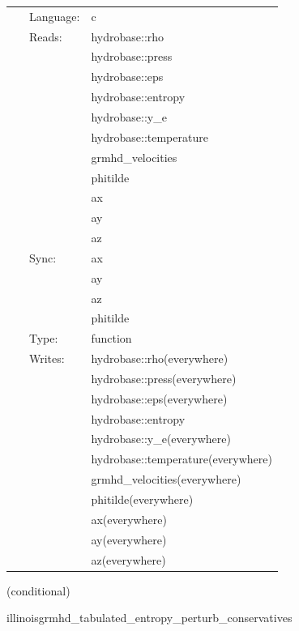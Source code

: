 \documentclass{article}
\begin{document}
\hspace{5mm}

 \begin{tabular*}{160mm}{cll} 
~ & Language:  & c \\ 
~ & Reads:  & hydrobase::rho \\ 
~& ~ &hydrobase::press\\ 
~& ~ &hydrobase::eps\\ 
~& ~ &hydrobase::entropy\\ 
~& ~ &hydrobase::y\_e\\ 
~& ~ &hydrobase::temperature\\ 
~& ~ &grmhd\_velocities\\ 
~& ~ &phitilde\\ 
~& ~ &ax\\ 
~& ~ &ay\\ 
~& ~ &az\\ 
~ & Sync:  & ax \\ 
~& ~ &ay\\ 
~& ~ &az\\ 
~& ~ &phitilde\\ 
~ & Type:  & function \\ 
~ & Writes:  & hydrobase::rho(everywhere) \\ 
~& ~ &hydrobase::press(everywhere)\\ 
~& ~ &hydrobase::eps(everywhere)\\ 
~& ~ &hydrobase::entropy\\ 
~& ~ &hydrobase::y\_e(everywhere)\\ 
~& ~ &hydrobase::temperature(everywhere)\\ 
~& ~ &grmhd\_velocities(everywhere)\\ 
~& ~ &phitilde(everywhere)\\ 
~& ~ &ax(everywhere)\\ 
~& ~ &ay(everywhere)\\ 
~& ~ &az(everywhere)\\ 
\end{tabular*} 


\vspace{5mm}

   (conditional) 

\hspace{5mm} illinoisgrmhd\_tabulated\_entropy\_perturb\_conservatives 

\hspace{5mm}{\it entropy+tabulated version of illinoisgrmhd\_perturb\_conservatives } 
\end{document}
